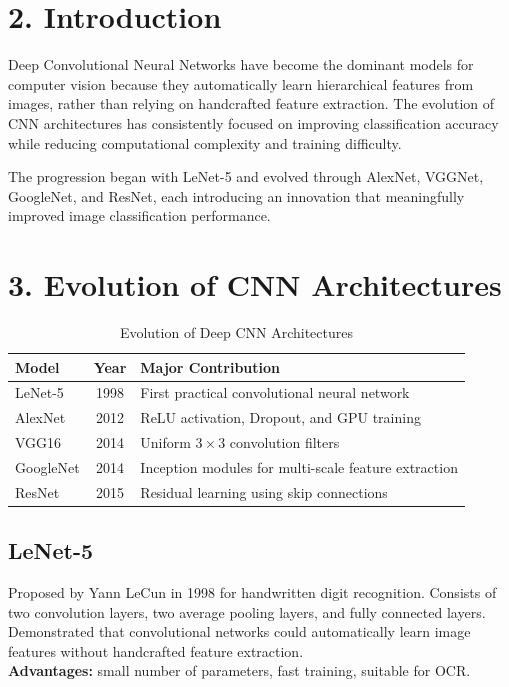 \documentclass[11pt]{article}
\begin{document}
\section*{2. Introduction}

Deep Convolutional Neural Networks have become the dominant models for computer vision because they automatically learn hierarchical features from images, rather than relying on handcrafted feature extraction. The evolution of CNN architectures has consistently focused on improving classification accuracy while reducing computational complexity and training difficulty.

The progression began with LeNet-5 and evolved through AlexNet, VGGNet, GoogleNet, and ResNet, each introducing an innovation that meaningfully improved image classification performance.


\section*{3. Evolution of CNN Architectures}

\begin{table}[H]
\centering
\caption{Evolution of Deep CNN Architectures}
\begin{tabular}{lcp{7cm}}
\toprule
Model & Year & Major Contribution \\
\midrule
LeNet-5 & 1998 & First practical convolutional neural network \\
AlexNet & 2012 & ReLU activation, Dropout, and GPU training \\
VGG16 & 2014 & Uniform $3\times3$ convolution filters \\
GoogleNet & 2014 & Inception modules for multi-scale feature extraction \\
ResNet & 2015 & Residual learning using skip connections \\
\bottomrule
\end{tabular}
\end{table}

\subsection*{LeNet-5}
Proposed by Yann LeCun in 1998 for handwritten digit recognition. Consists of two convolution layers, two average pooling layers, and fully connected layers. Demonstrated that convolutional networks could automatically learn image features without handcrafted feature extraction.\\
\textbf{Advantages:} small number of parameters, fast training, suitable for OCR.
\end{document}
